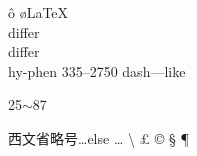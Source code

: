\documentclass{article}
\begin{document}
	\^o \o \LaTeX\\
	differ\\%
	dif{}fer\\%
	hy-phen 335--2750 dash---like%
	\par 25$\sim$87
	\par 西文省略号\ldots else \dots
	\textbackslash %
	\textbullet
	\texttrademark
	\textregistered
	\pounds
	\copyright
	\S 
	\dag
	\ddag
	\P 
\end{document}
